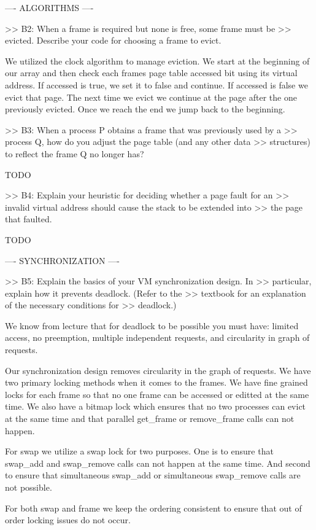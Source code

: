 ---- ALGORITHMS ----

>> B2: When a frame is required but none is free, some frame must be
>> evicted.  Describe your code for choosing a frame to evict.

 We utilized the clock algorithm to manage eviction. We start at the beginning
 of our array and then check each frames page table accessed bit using its
 virtual address. If accessed is true, we set it to false and continue. If
 accessed is false we evict that page. The next time we evict we continue
 at the page after the one previously evicted. Once we reach the end we jump
 back to the beginning.


>> B3: When a process P obtains a frame that was previously used by a
>> process Q, how do you adjust the page table (and any other data
>> structures) to reflect the frame Q no longer has?

TODO

>> B4: Explain your heuristic for deciding whether a page fault for an
>> invalid virtual address should cause the stack to be extended into
>> the page that faulted.

TODO

---- SYNCHRONIZATION ----

>> B5: Explain the basics of your VM synchronization design.  In
>> particular, explain how it prevents deadlock.  (Refer to the
>> textbook for an explanation of the necessary conditions for
>> deadlock.)

We know from lecture that for deadlock to be possible you must have: limited 
access, no preemption, multiple independent requests, and circularity in 
graph of requests. 

Our synchronization design removes circularity in the graph of requests.
We have two primary locking methods when it comes to the frames. We have
fine grained locks for each frame so that no one frame can be accessed
or editted at the same time. We also have a bitmap lock which ensures that
no two processes can evict at the same time and that parallel get_frame
or remove_frame calls can not happen. 

For swap we utilize a swap lock for two purposes. One is to ensure that
swap_add and swap_remove calls can not happen at the same time. And second
to ensure that simultaneous swap_add or simultaneous swap_remove calls
are not possible. 

For both swap and frame we keep the ordering consistent
to ensure that out of order locking issues do not occur. 

